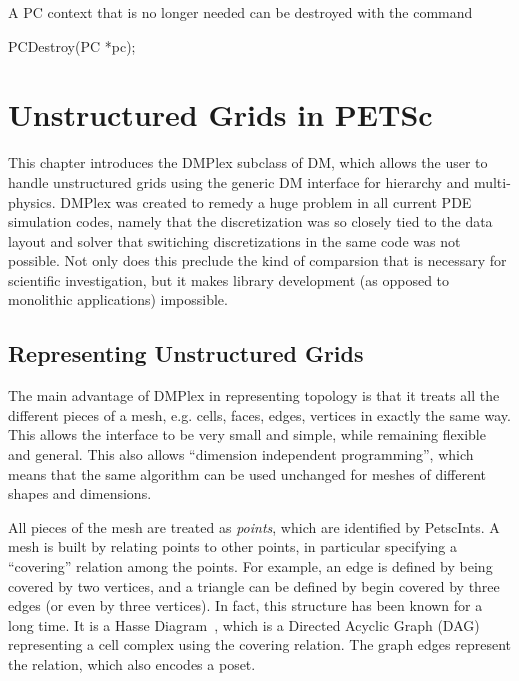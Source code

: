 {{{A PC context that is no longer needed can be destroyed with the
command
\begin{tabbing}
  PCDestroy(PC *pc);
\end{tabbing}


\cleardoublepage
\chapter{Unstructured Grids in PETSc}
\label{ch_unstructured}

This chapter introduces the DMPlex subclass of DM, which allows the user to handle unstructured grids using the generic
DM interface for hierarchy and multi-physics. DMPlex was created to remedy a huge problem in all current PDE
simulation codes, namely that the discretization was so closely tied to the data layout and solver that switiching
discretizations in the same code was not possible. Not only does this preclude the kind of comparsion that is necessary
for scientific investigation, but it makes library development (as opposed to monolithic applications) impossible.

\medskip \medskip

\section{Representing Unstructured Grids} 

The main advantage of DMPlex in representing topology is that it treats all the different pieces of a mesh,
e.g. cells, faces, edges, vertices in exactly the same way. This allows the interface to be very small and simple, while
remaining flexible and general. This also allows ``dimension independent programming'', which means that the same
algorithm can be used unchanged for meshes of different shapes and dimensions.

All pieces of the mesh are treated as \textit{points}, which are identified by PetscInts. A mesh is built by relating
points to other points, in particular specifying a ``covering'' relation among the points. For example, an edge is
defined by being covered by two vertices, and a triangle can be defined by begin covered by three edges (or even by
three vertices). In fact, this structure has been known for a long time. It is a Hasse Diagram~\cite{HasseDiagram},
which is a Directed Acyclic Graph (DAG) representing a cell complex using the covering relation. The graph edges
represent the relation, which also encodes a poset.

}}}
